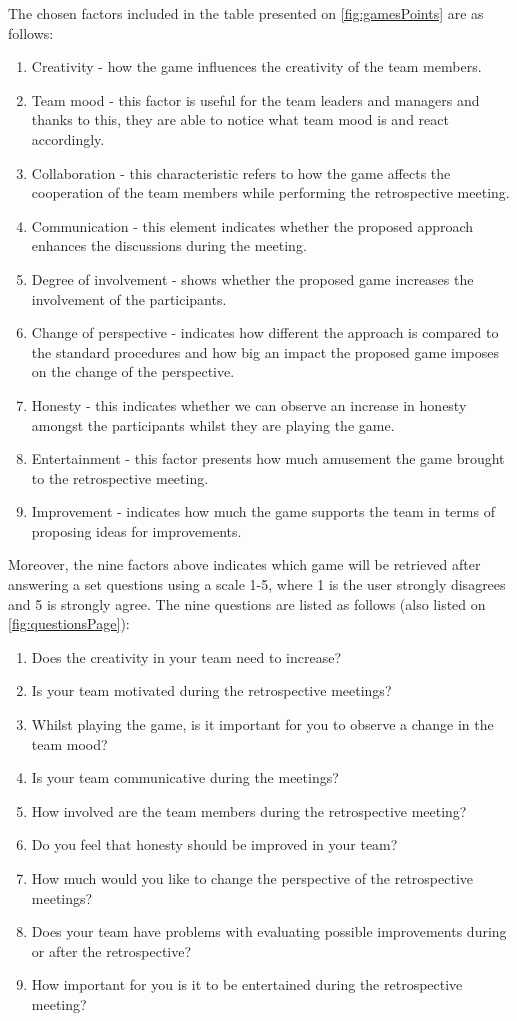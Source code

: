 The chosen factors included in the table presented on \autoref{fig:gamesPoints} are as follows:
\begin{enumerate}
    \item Creativity - how the game influences the creativity of the team members.
    \item Team mood - this factor is useful for the team leaders and managers and thanks to this, they are able to notice what team mood is and react accordingly.
    \item Collaboration - this characteristic refers to how the game affects the cooperation of the team members while performing the retrospective meeting. 
    \item Communication - this element indicates whether the proposed approach enhances the discussions during the meeting.
    \item Degree of involvement - shows whether the proposed game increases the involvement of the participants.
    \item Change of perspective - indicates how different the approach is compared to the standard procedures and how big an impact the proposed game imposes on the change of the perspective.
    \item Honesty - this indicates whether we can observe an increase in honesty amongst the participants whilst they are playing the game.
    \item Entertainment - this factor presents how much amusement the game brought to the retrospective meeting.
    \item Improvement - indicates how much the game supports the team in terms of proposing ideas for improvements.
\end{enumerate}

Moreover, the nine factors above indicates which game will be retrieved after answering a set questions using a scale 1-5, where 1 is the user strongly disagrees and 5 is strongly agree. The nine questions are listed as follows (also listed on \autoref{fig:questionsPage}):
\begin{enumerate}
    \item Does the creativity in your team need to increase? 
    \item Is your team motivated during the retrospective meetings? 
    \item Whilst playing the game, is it important for you to observe a change in the team mood? 
    \item Is your team communicative during the meetings?
    \item How involved are the team members during the retrospective meeting?
    \item Do you feel that honesty should be improved in your team?
    \item How much would you like to change the perspective of the retrospective meetings?
    \item Does your team have problems with evaluating possible improvements during or after the retrospective?
    \item How important for you is it to be entertained during the retrospective meeting?
\end{enumerate}

